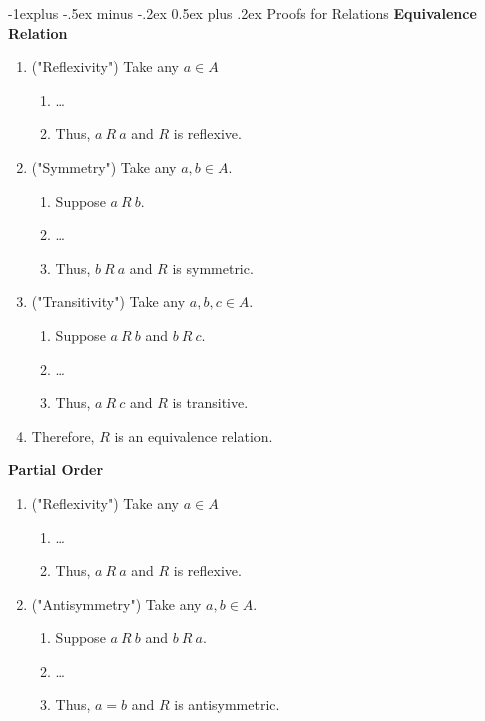 \documentclass[10pt, landscape]{article}
\makeatletter
\renewcommand{\subsection}{\@startsection{subsection}{2}{0mm}%
                                {-1explus -.5ex minus -.2ex}%
                                {0.5ex plus .2ex}%
                                {\normalfont\normalsize\bfseries}}
\renewcommand{\bf}[1]{\textbf{#1}}
\makeatother
\begin{document}
\begin{multicols}{4}
\subsection{Proofs for Relations}
\bf{Equivalence Relation}
\begin{enumerate}
    \item ("Reflexivity") Take any $a \in A$
    \begin{enumerate}
        \item \dots
        \item Thus, $a \ R \ a$ and $R$ is reflexive.
    \end{enumerate}

    \item ("Symmetry") Take any $a,b \in A$.
    \begin{enumerate}
        \item Suppose $a \ R \ b$.
        \item \dots
        \item Thus, $b \ R \ a$ and $R$ is symmetric.
    \end{enumerate}

    \item ("Transitivity") Take any $a,b,c \in A$.
    \begin{enumerate}
        \item Suppose $a \ R \ b$ and $b \ R \ c$.
        \item \dots
        \item Thus, $a \ R \ c$ and $R$ is transitive.
    \end{enumerate}

    \item Therefore, $R$ is an equivalence relation.
\end{enumerate}
\bf{Partial Order}
\begin{enumerate}
    \item ("Reflexivity") Take any $a \in A$
    \begin{enumerate}
        \item \dots
        \item Thus, $a \ R \ a$ and $R$ is reflexive.
    \end{enumerate}

    \item ("Antisymmetry") Take any $a,b \in A$.
    \begin{enumerate}
        \item Suppose $a \ R \ b$ and $b \ R \ a$.
        \item \dots
        \item Thus, $a = b$ and $R$ is antisymmetric.
    \end{enumerate}


\end{enumerate}
\end{multicols}
\end{document}
